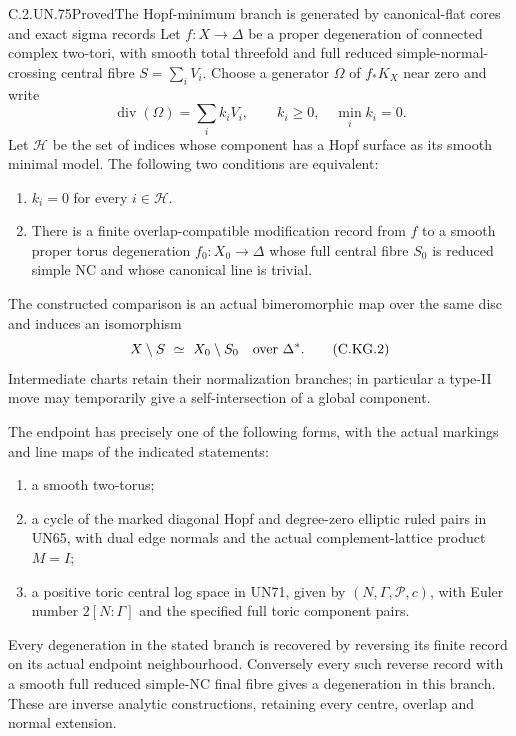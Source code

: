 \begin{statement}{C.2.UN.75}{Proved}{The Hopf-minimum branch is generated by canonical-flat cores and exact sigma records}
Let $f:X\to\Delta$ be a proper degeneration of connected
complex two-tori, with smooth total threefold and full
reduced simple-normal-crossing central fibre $S=\sum_iV_i$.
Choose a generator $\Omega$ of $f_*K_X$ near zero and write
\[
             \operatorname{div}(\Omega)=\sum_i k_iV_i,
                  \qquad k_i\ge0,\quad \min_i k_i=0.
\tag{C.KG.1}
\]
Let $\mathcal H$ be the set of indices whose component has
a Hopf surface as its smooth minimal model. The following
two conditions are equivalent:
\begin{enumerate}
\item $k_i=0$ for every $i\in\mathcal H$.
\item There is a finite overlap-compatible modification
record from $f$ to a smooth proper torus degeneration
$f_0:X_0\to\Delta$ whose full central fibre $S_0$ is
reduced simple NC and whose canonical line is trivial.
\end{enumerate}
The constructed comparison is an actual bimeromorphic map
over the same disc and induces an isomorphism
\[
                X\setminus S\ \simeq\ X_0\setminus S_0
                         \quad\hbox{over }\Delta^*.
\tag{C.KG.2}
\]
Intermediate charts retain their normalization branches;
in particular a type-II move may temporarily give a
self-intersection of a global component.

The endpoint has precisely one of the following forms,
with the actual markings and line maps of the indicated
statements:
\begin{enumerate}
\item a smooth two-torus;
\item a cycle of the marked diagonal Hopf and degree-zero
elliptic ruled pairs in UN65, with dual edge normals and
the actual complement-lattice product $M=I$;
\item a positive toric central log space in UN71, given by
$(N,\Gamma,\mathscr P,c)$, with Euler number
$2[N:\Gamma]$ and the specified full toric component pairs.
\end{enumerate}
Every degeneration in the stated branch is recovered by
reversing its finite record on its actual endpoint
neighbourhood. Conversely every such reverse record with
a smooth full reduced simple-NC final fibre gives a
degeneration in this branch. These are inverse analytic
constructions, retaining every centre, overlap and normal
extension.


\end{statement}
